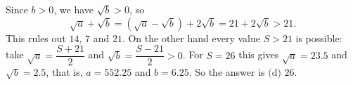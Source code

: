 Since $b>0$, we have $\sqrt b>0$, so
\[\sqrt a+\sqrt b=\left(\sqrt a-\sqrt b\right)+2\sqrt b=21+2\sqrt b>21 .\]
This rules out $14$, $7$ and $21$. On the other hand every value $S>21$ is possible: take $\sqrt a=\dfrac{S+21}{2}$ and $\sqrt b=\dfrac{S-21}{2}>0$. For $S=26$ this gives $\sqrt a=23.5$ and $\sqrt b=2.5$, that is, $a=552.25$ and $b=6.25$. So the answer is $\boxed{\text{(d) } 26}$.
